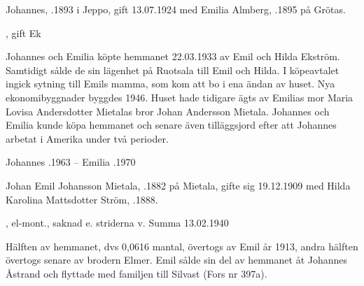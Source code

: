 Johannes, .1893 i Jeppo,  gift 13.07.1924 med Emilia Almberg, .1895 på Grötas.
\begin{jhchildren}
  \item {}
  \item {}, gift Ek
\end{jhchildren}

Johannes och Emilia köpte hemmanet 22.03.1933 av Emil och Hilda Ekström. Samtidigt sålde de sin lägenhet på  Ruotsala till Emil och Hilda. I köpeavtalet ingick sytning till Emils mamma, som kom att bo i ena ändan av huset. Nya ekonomibyggnader byggdes 1946. Huset hade tidigare ägts av Emilias mor Maria Lovisa Andersdotter Mietalas bror Johan Andersson Mietala. Johannes och Emilia kunde köpa hemmanet och senare även tilläggsjord efter att Johannes arbetat i Amerika under två perioder.

Johannes .1963  --  Emilia .1970


Johan Emil Johansson Mietala, .1882 på Mietala, gifte sig 19.12.1909  med Hilda Karolina Mattsdotter Ström, .1888.
\begin{jhchildren}
  \item {}
  \item {}, el-mont., saknad e. striderna v. Summa 13.02.1940
  \item {}
  \item {}
  \item {}
  \item {}
  \item {}
  \item {}
  \item {}
  \item {}
\end{jhchildren}

Hälften av hemmanet, dvs 0,0616 mantal, övertogs av Emil år 1913, andra hälften övertogs senare av brodern Elmer. Emil sålde sin del av hemmanet åt Johannes Åstrand och flyttade med familjen till Silvast (Fors nr 397a).


